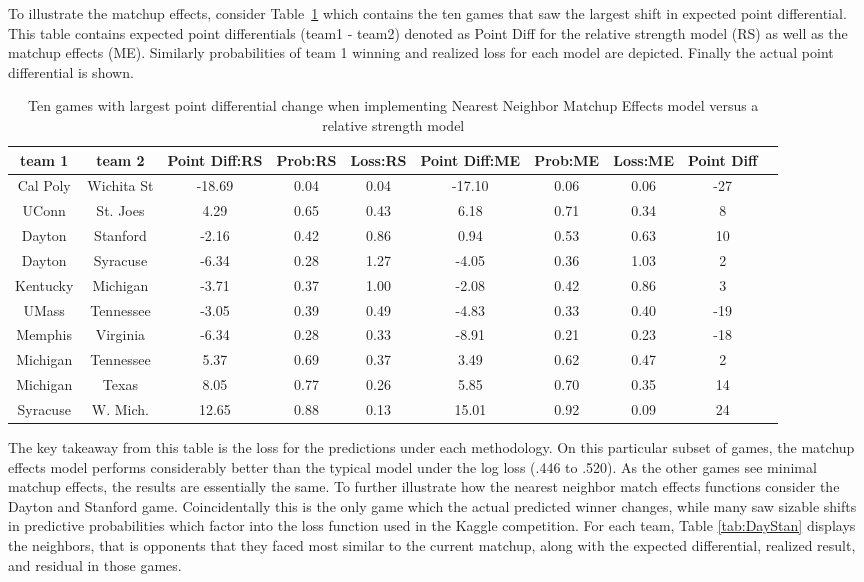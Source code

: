 To illustrate the matchup effects, consider Table~\ref{tab:change} which contains the ten games that saw the largest shift in expected point differential. This table contains expected point differentials (team1 - team2) denoted as Point Diff for the relative strength model (RS) as well as the matchup effects (ME).  Similarly probabilities of team 1 winning and realized loss for each model are depicted.  Finally the actual point differential is shown.
\begin{table}[h!]
\caption{ Ten games with largest point differential change when implementing Nearest Neighbor Matchup Effects model versus a relative strength model}
\scriptsize
\centering
\begin{tabular}{|cc | ccc | ccc | c|c|}
  \hline
  \hline
 team 1 & team 2 & Point Diff:RS & Prob:RS & Loss:RS & Point Diff:ME & Prob:ME & Loss:ME & Point Diff\\ 
  \hline
 Cal Poly & Wichita St & -18.69 & 0.04 & 0.04 & -17.10 & 0.06 & 0.06 &  -27\\ 
 UConn & St. Joes &4.29 & 0.65 & 0.43 & 6.18 & 0.71 & 0.34 & 8\\ 
 Dayton & Stanford & -2.16 & 0.42 & 0.86 & 0.94 & 0.53 & 0.63 & 10 \\ 
 Dayton & Syracuse & -6.34 & 0.28 & 1.27 & -4.05 & 0.36 & 1.03 & 2\\ 
 Kentucky & Michigan & -3.71 & 0.37 & 1.00 & -2.08 & 0.42 & 0.86 &  3\\ 
 UMass & Tennessee &-3.05 & 0.39 & 0.49 & -4.83 & 0.33 & 0.40 & -19\\ 
 Memphis & Virginia & -6.34 & 0.28 & 0.33 & -8.91 & 0.21 & 0.23 & -18\\ 
 Michigan & Tennessee & 5.37 & 0.69 & 0.37 & 3.49 & 0.62 & 0.47 & 2\\ 
 Michigan & Texas & 8.05 & 0.77 & 0.26 & 5.85 & 0.70 & 0.35 & 14\\ 
 Syracuse & W. Mich. & 12.65 & 0.88 & 0.13 & 15.01 & 0.92 & 0.09 & 24\\ 
   \hline
   \hline
\end{tabular}
\label{tab:change}
\end{table}
The key takeaway from this table is the loss for the predictions under each methodology. On this particular subset of games, the matchup effects model performs considerably better than the typical model under the log loss (.446 to .520). As the other games see minimal matchup effects, the results are essentially the same.  To further illustrate how the nearest neighbor match effects functions consider the Dayton and Stanford game.  Coincidentally this is the only game which the actual predicted winner changes, while many saw sizable shifts in predictive probabilities which factor into the loss function used in the Kaggle competition.  For each team, Table \ref{tab:DayStan} displays the neighbors, that is opponents that they faced most similar to the current matchup, along with the expected differential, realized result, and residual in those games. 
